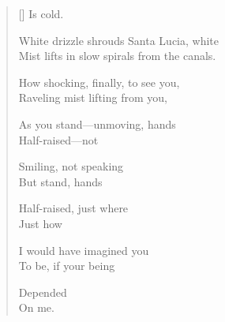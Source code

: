 \label{ch:venice_venezia}
\settowidth{\versewidth}{Mist lifts in slow spirals from the canals.}
\begin{verse}[\versewidth]
\hspace*{3\vgap} Is cold.

White drizzle shrouds Santa Lucia, white\\
Mist lifts in slow spirals from the canals.

How shocking, finally, to see you,\\
Raveling mist lifting from you,

As you stand---unmoving, hands\\
Half-raised---not

Smiling, not speaking\\
But stand, hands

Half-raised, just where\\
Just how

I would have imagined you\\
To be, if your being

Depended\\
On me.
\end{verse}
